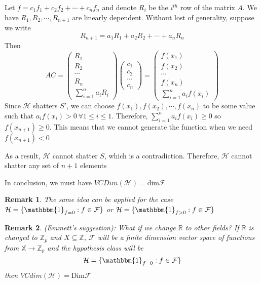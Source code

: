 \documentclass{article}
\newtheorem{rmk}{Remark}
\begin{document}
Let $f=c_1f_1+c_2f_2+\cdots+c_nf_n$ and denote $R_i$ be the $i^{th}$ row of the matrix $A$. We have $R_1,R_2,\cdots,R_{n+1}$ are linearly dependent. Without lost of generality, suppose we write
$$R_{n+1} = a_1R_1+a_2R_2+\cdots+a_nR_n$$
Then
$$AC = \begin{pmatrix}
R_1\\
R_2\\
\cdots\\
R_n\\
\displaystyle \sum_{i=1}^n a_iR_i
\end{pmatrix}\begin{pmatrix}
c_1\\
c_2\\
\cdots\\
c_n
\end{pmatrix}=\begin{pmatrix}
f(x_1)\\
f(x_2)\\
\cdots\\
f(x_n)\\
\displaystyle \sum_{i=1}^n a_if(x_i)
\end{pmatrix}$$
Since $\mathcal{H}$ shatters $S'$, we can choose $f(x_1),f(x_2),\cdots,f(x_n)$ to be some value such that $a_if(x_i)>0 \ \forall 1 \leq i \leq 1$. Therefore, $\displaystyle \sum_{i=1}^n a_if(x_i) \geq 0$ so $f(x_{n+1}) \geq 0$. This means that we cannot generate the function when we need $f(x_{n+1})<0$

As a result, $\mathcal{H}$ cannot shatter $S$, which is a contradiction. Therefore, $\mathcal{H}$ cannot shatter any set of $n+1$ elements

In conclusion, we must have $VCDim(\mathcal{H})=\text{dim} \mathcal{F}$
\begin{rmk}
The same idea can be applied for the case $\mathcal{H} = \{\mathbbm{1}_{f=0}: f \in \mathcal{F} \}$ or $\mathcal{H} = \{\mathbbm{1}_{f>0}: f \in \mathcal{F} \}$
\end{rmk}

\begin{rmk}
(Emmett's suggestion): What if we change $\mathbb{R}$ to other fields? If $\mathbb{R}$ is changed to $\mathbb{Z}_p$ and $X \subseteq \mathbb{Z}$, $\mathcal{F}$ will be a finite dimension vector space of functions from $\mathbb{X} \rightarrow \mathbb{Z}_p$ and the hypothesis class will be
$$\mathcal{H} = \{\mathbbm{1}_{f=0}: f \in \mathcal{F}\}$$
then $VCdim(\mathcal{H}) = \text{Dim} \mathcal{F}$
\end{rmk}
\end{document}
